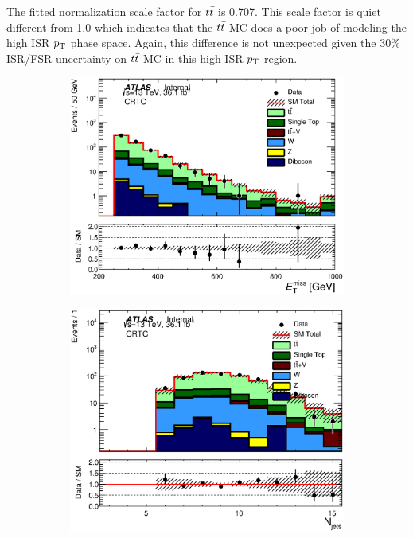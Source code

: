 \indent The fitted normalization scale factor for $t\bar{t}$ is 0.707. This scale factor is quiet different from 1.0 which indicates that the $t\bar{t}$ MC does a poor job of modeling the high ISR $p_{\mathrm{T}}$ phase space.  Again, this difference is not unexpected given the 30\% ISR/FSR uncertainty on $t\bar{t}$ MC in this high ISR $p_{\mathrm{T}}$ region.  \\

\begin{figure}[h!]
  \begin{center}
      \begin{subfigure}[b]{0.40\textwidth}    
    	 \includegraphics[width=\textwidth]{figures/plotRegion/Met_CRTopC_log.eps}
                \caption{ }
    \end{subfigure}
        \begin{subfigure}[b]{0.40\textwidth}    
    	 \includegraphics[width=\textwidth]{figures/plotRegion/NJets_CRTopC_log.eps}

\end{subfigure}
\end{center}
\end{figure}

